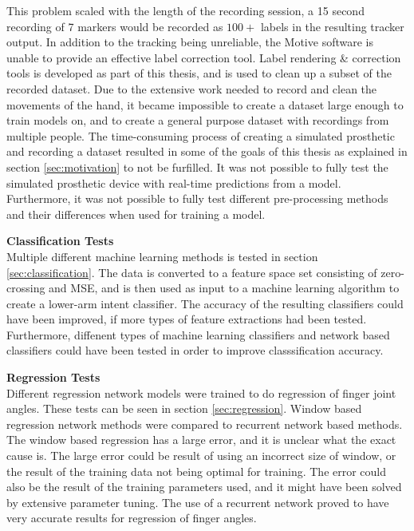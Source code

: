 \documentclass[../main.tex]{subfiles}
\begin{document}
This problem scaled with the length of the recording session, a 15 second recording of 7 markers would be recorded as $100+$ labels in the resulting tracker output.
In addition to the tracking being unreliable, the Motive software is unable to provide an effective label correction tool.
Label rendering \& correction tools is developed as part of this thesis, and is used to clean up a subset of the recorded dataset.
Due to the extensive work needed to record and clean the movements of the hand, it became impossible to create a dataset large enough to train models on, and to create a general purpose dataset with recordings from multiple people. 
The time-consuming process of creating a simulated prosthetic and recording a dataset resulted in some of the goals of this thesis as explained in section \ref{sec:motivation} to not be furfilled.
It was not possible to fully test the simulated prosthetic device with real-time predictions from a model. 
Furthermore, it was not possible to fully test different pre-processing methods and their differences when used for training a model.


\textbf{Classification Tests}\\
Multiple different machine learning methods is tested in section \ref{sec:classification}.
The data is converted to a feature space set consisting of zero-crossing and MSE, and is then used as input to a machine learning algorithm to create a lower-arm intent classifier.
The accuracy of the resulting classifiers could have been improved, if more types of feature extractions had been tested.
Furthermore, diffenent types of machine learning classifiers and network based classifiers could have been tested in order to improve classsification accuracy.

\textbf{Regression Tests}\\
Different regression network models were trained to do regression of finger joint angles. These tests can be seen in section \ref{sec:regression}.
Window based regression network methods were compared to recurrent network based methods.
The window based regression has a large error, and it is unclear what the exact cause is.
The large error could be result of using an incorrect size of window, or the result of the training data not being optimal for training.
The error could also be the result of the training parameters used, and it might have been solved by extensive parameter tuning.
The use of a recurrent network proved to have very accurate results for regression of finger angles.
\end{document}
